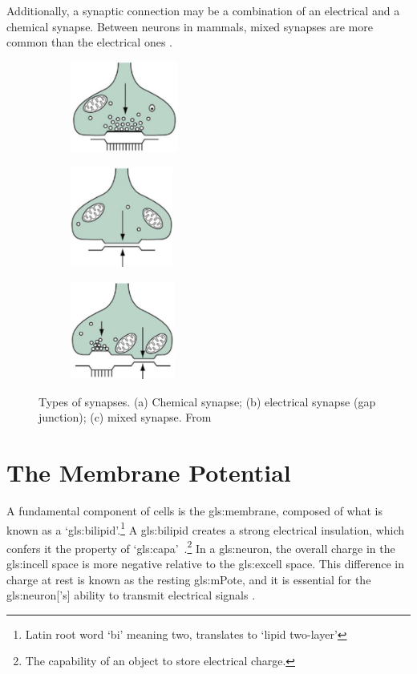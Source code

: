 \documentclass[class={myRUCProject}, crop=false]{standalone}
\begin{document}
Additionally, a synaptic connection may be a combination of an electrical and a chemical synapse. Between neurons in mammals, mixed synapses are more common than the electrical ones \cite{Hammond2015ch6}.
\begin{figure}[H]
    \centering
    \begin{subfigure}[t]{0.25\textwidth}
    \centering
      \caption{}
      \includegraphics[height=3cm]{Pictures/Anakin/chem.syn.png}
    \end{subfigure}
    \begin{subfigure}[t]{0.3\textwidth}
    \centering
      \caption{}
      \includegraphics[height=3.3cm]{Pictures/Anakin/el.syn.png}
    \end{subfigure}
     \begin{subfigure}[t]{0.2\textwidth}
    \centering
      \caption{}
      \includegraphics[height=3.2cm]{Pictures/Anakin/mix.syn.png}
    \end{subfigure}
      \caption{Types of synapses. (a) Chemical synapse; (b) electrical synapse (gap junction); (c) mixed synapse. From \cite{Hammond2015ch6}}\label{fig:synapses} 
\end{figure}

\section{The Membrane Potential} 
A fundamental component of cells is the \gls{gls:membrane}, composed of what is known as a `\gls{gls:bilipid}'.{}\footnote{Latin root word `bi' meaning two, translates to `lipid two-layer'} 
A \gls{gls:bilipid} creates a strong electrical insulation, which confers it the property of `\gls{gls:capa}'~\cite{Hammond2015ch3,Hammond2015ch4}.{}\footnote{The capability of an object to store electrical charge.}
In a \gls{gls:neuron}, the overall charge in the \gls{gls:incell} space is more negative relative to the \gls{gls:excell} space. This difference in charge at rest is known as the resting \gls{gls:mPote}, and it is essential for the \gls{gls:neuron}['s] ability to transmit electrical signals \cite{Hammond2015ch3,Hammond2015ch4}. 
\end{document}
